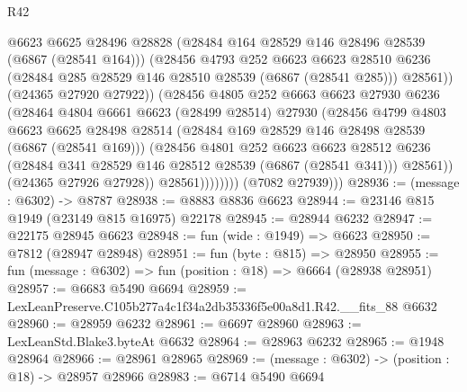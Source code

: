 \begin{lexlean}{R42}
\begin{coremodule}
{                          @6623
                          @6625
                          @28496
                          @28828
                          (@28484 @164 @28529 @146 @28496 @28539 (@6867 (@28541 @164)))
                          (@28456
                            @4793
                            @252
                            @6623
                            @6623
                            @28510
                            @6236
                            (@28484 @285 @28529 @146 @28510 @28539 (@6867 (@28541 @285)))
                            @28561))
                        (@24365 @27920 @27922))
                      (@28456
                        @4805
                        @252
                        @6663
                        @6623
                        @27930
                        @6236
                        (@28464
                          @4804
                          @6661
                          @6623
                          (@28499 @28514)
                          @27930
                          (@28456
                            @4799
                            @4803
                            @6623
                            @6625
                            @28498
                            @28514
                            (@28484 @169 @28529 @146 @28498 @28539 (@6867 (@28541 @169)))
                            (@28456
                              @4801
                              @252
                              @6623
                              @6623
                              @28512
                              @6236
                              (@28484 @341 @28529 @146 @28512 @28539 (@6867 (@28541 @341)))
                              @28561))
                          (@24365 @27926 @27928))
                        @28561))))))))
        (@7082 @27939)))
@28936 := (message : @6302) -> @8787
@28938 := @8883 @8836 @6623
@28944 := @23146 @815 @1949 (@23149 @815 @16975) @22178
@28945 := @28944 @6232
@28947 := @22175 @28945 @6623
@28948 := fun (wide : @1949) => @6623
@28950 := @7812 (@28947 @28948)
@28951 := fun (byte : @815) => @28950
@28955 := fun (message : @6302) => fun (position : @18) => @6664 (@28938 @28951)
@28957 := @6683 @5490 @6694
@28959 := LexLeanPreserve.C105b277a4c1f34a2db35336f5e00a8d1.R42.__fits_88 @6632
@28960 := @28959 @6232
@28961 := @6697 @28960
@28963 := LexLeanStd.Blake3.byteAt @6632
@28964 := @28963 @6232
@28965 := @1948 @28964
@28966 := @28961 @28965
@28969 := (message : @6302) -> (position : @18) -> @28957 @28966
@28983 := @6714
    @5490
    @6694
}
\end{coremodule}
\end{lexlean}
